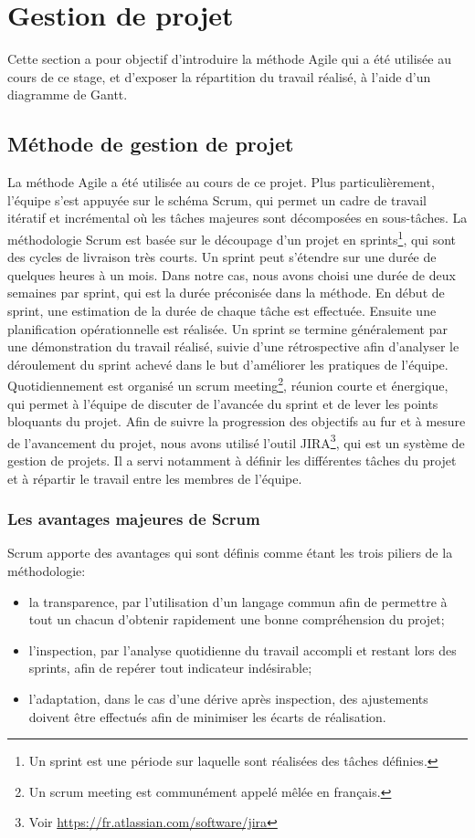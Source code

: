 \documentclass{tnreport}
\begin{document}
\section{Gestion de projet}

Cette section a pour objectif d'introduire la méthode Agile qui a été utilisée au cours de ce stage, et d'exposer la répartition du travail réalisé, à l'aide d'un diagramme de Gantt.

\subsection{Méthode de gestion de projet}

La méthode Agile a été utilisée au cours de ce projet. 
Plus particulièrement, l'équipe s'est appuyée sur le schéma Scrum, qui permet un cadre de travail itératif et incrémental où les tâches majeures sont décomposées en sous-tâches.
La méthodologie Scrum est basée sur le découpage d'un projet en sprints\footnote{Un sprint est une période sur laquelle sont réalisées des tâches définies.}, qui sont des cycles de livraison très courts.
Un sprint peut s'étendre sur une durée de quelques heures à un mois. 
Dans notre cas, nous avons choisi une durée de deux semaines par sprint, qui est la durée préconisée dans la méthode.
En début de sprint, une estimation de la durée de chaque tâche est effectuée. Ensuite une planification opérationnelle est réalisée.
Un sprint se termine généralement par une démonstration du travail réalisé, suivie d'une rétrospective afin d'analyser le déroulement du sprint achevé dans le but d'améliorer les pratiques de l'équipe. 
Quotidiennement est organisé un scrum meeting\footnote{Un scrum meeting est communément appelé mêlée en français.}, réunion courte et énergique, qui permet à l'équipe de discuter de l'avancée du sprint et de lever les points bloquants du projet.
Afin de suivre la progression des objectifs au fur et à mesure de l’avancement du projet, nous avons utilisé l'outil JIRA\footnote{Voir \url{https://fr.atlassian.com/software/jira}}, qui est un système de gestion de projets. Il a servi notamment à définir les différentes tâches du projet et à répartir le travail entre les membres de l’équipe.

\subsubsection{Les avantages majeures de Scrum}

Scrum apporte des avantages qui sont définis comme étant les trois piliers de la méthodologie:
\begin{itemize}
	\item la transparence, par l'utilisation d'un langage commun afin de permettre à tout un chacun d'obtenir rapidement une bonne compréhension du projet; 
	\item l'inspection, par l'analyse quotidienne du travail accompli et restant lors des sprints, afin de repérer tout indicateur indésirable;
	\item l'adaptation, dans le cas d'une dérive après inspection, des ajustements doivent être effectués afin de minimiser les écarts de réalisation.
\end{itemize}
\end{document}

